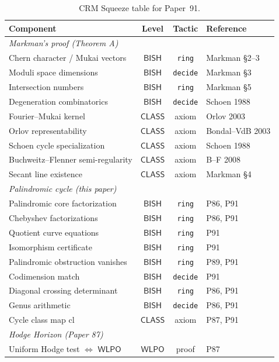 \documentclass[11pt]{article}
\theoremstyle{plain}
\theoremstyle{definition}
\theoremstyle{remark}
\newcommand{\BISH}{\mathsf{BISH}}
\newcommand{\WLPO}{\mathsf{WLPO}}
\newcommand{\CLASS}{\mathsf{CLASS}}
\begin{document}
\begin{table}[ht]
\centering
\small
\begin{tabular}{p{5.5cm}ccp{3cm}}
\toprule
\textbf{Component} & \textbf{Level} & \textbf{Tactic} & \textbf{Reference} \\
\midrule
\multicolumn{4}{l}{\emph{Markman's proof (Theorem A)}} \\
Chern character / Mukai vectors & $\BISH$ & \texttt{ring} & Markman \S2--3 \\
Moduli space dimensions & $\BISH$ & \texttt{decide} & Markman \S3 \\
Intersection numbers & $\BISH$ & \texttt{ring} & Markman \S5 \\
Degeneration combinatorics & $\BISH$ & \texttt{decide} & Schoen 1988 \\
Fourier--Mukai kernel & $\CLASS$ & axiom & Orlov 2003 \\
Orlov representability & $\CLASS$ & axiom & Bondal--VdB 2003 \\
Schoen cycle specialization & $\CLASS$ & axiom & Schoen 1988 \\
Buchweitz--Flenner semi-regularity & $\CLASS$ & axiom & B--F 2008 \\
Secant line existence & $\CLASS$ & axiom & Markman \S4 \\
\midrule
\multicolumn{4}{l}{\emph{Palindromic cycle (this paper)}} \\
Palindromic core factorization & $\BISH$ & \texttt{ring} & P86, P91 \\
Chebyshev factorizations & $\BISH$ & \texttt{ring} & P86, P91 \\
Quotient curve equations & $\BISH$ & \texttt{ring} & P91 \\
Isomorphism certificate & $\BISH$ & \texttt{ring} & P91 \\
Palindromic obstruction vanishes & $\BISH$ & \texttt{ring} & P89, P91 \\
Codimension match & $\BISH$ & \texttt{decide} & P91 \\
Diagonal crossing determinant & $\BISH$ & \texttt{ring} & P86, P91 \\
Genus arithmetic & $\BISH$ & \texttt{decide} & P86, P91 \\
Cycle class map $\mathrm{cl}$ & $\CLASS$ & axiom & P87, P91 \\
\midrule
\multicolumn{4}{l}{\emph{Hodge Horizon (Paper 87)}} \\
Uniform Hodge test $\Leftrightarrow$ $\WLPO$ & $\WLPO$ & proof & P87 \\
\bottomrule
\end{tabular}
\caption{CRM Squeeze table for Paper~91.}
\label{tab:squeeze}
\end{table}
\end{document}
